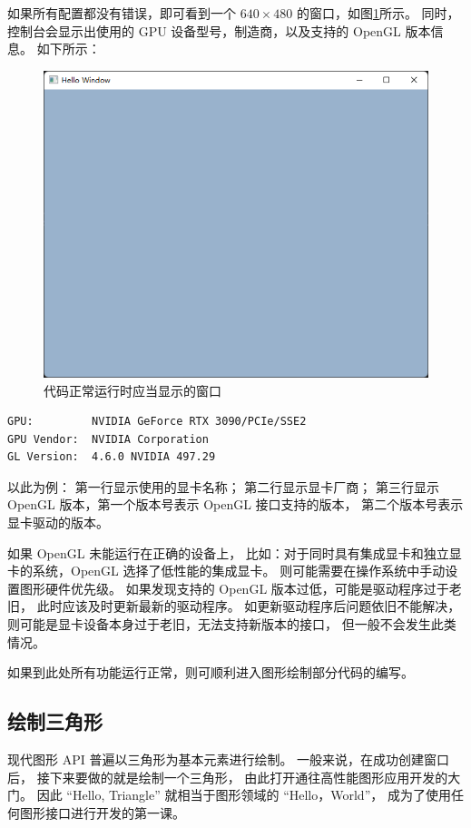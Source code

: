 \documentclass[fontset=windows]{ctexart}
\begin{document}
如果所有配置都没有错误，即可看到一个 $640\times 480$ 的窗口，如图\ref{fig-gl:hello-window}所示。
同时，控制台会显示出使用的 GPU 设备型号，制造商，以及支持的 OpenGL 版本信息。
如下所示：

\begin{figure}[htbp]
    \centering
    \includegraphics[width = 0.5\linewidth]{imgs/sec 2.4/hello-window.png}
    \caption{代码正常运行时应当显示的窗口}
    \label{fig-gl:hello-window}
\end{figure}

\begin{lstlisting}
GPU:         NVIDIA GeForce RTX 3090/PCIe/SSE2
GPU Vendor:  NVIDIA Corporation
GL Version:  4.6.0 NVIDIA 497.29
\end{lstlisting}

以此为例：
第一行显示使用的显卡名称；
第二行显示显卡厂商；
第三行显示 OpenGL 版本，第一个版本号表示 OpenGL 接口支持的版本，
第二个版本号表示显卡驱动的版本。

如果 OpenGL 未能运行在正确的设备上，
比如：对于同时具有集成显卡和独立显卡的系统，OpenGL 选择了低性能的集成显卡。
则可能需要在操作系统中手动设置图形硬件优先级。
如果发现支持的 OpenGL 版本过低，可能是驱动程序过于老旧，
此时应该及时更新最新的驱动程序。
如更新驱动程序后问题依旧不能解决，
则可能是显卡设备本身过于老旧，无法支持新版本的接口，
但一般不会发生此类情况。

\label{sec-gl:creating-opengl-window}

如果到此处所有功能运行正常，则可顺利进入图形绘制部分代码的编写。

\subsection{绘制三角形}

现代图形 API 普遍以三角形为基本元素进行绘制。
一般来说，在成功创建窗口后，
接下来要做的就是绘制一个三角形，
由此打开通往高性能图形应用开发的大门。
因此 “Hello, Triangle” 就相当于图形领域的 “Hello，World”，
成为了使用任何图形接口进行开发的第一课。
\end{document}
